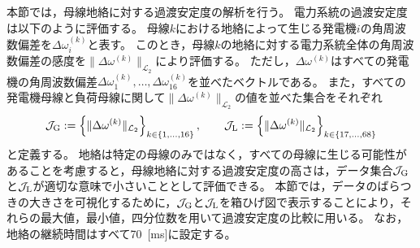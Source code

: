\documentclass[tombow,dvipdfmx]{corona-a5-1.1}
\begin{document}
本節では，母線地絡に対する過渡安定度の解析を行う。
電力系統の過渡安定度は以下のように評価する。
母線$k$における地絡によって生じる発電機$i$の角周波数偏差を$\Delta \omega_i^{(k)}$と表す。
このとき，母線$k$の地絡に対する電力系統全体の角周波数偏差の感度を$\|\Delta \omega^{(k)}\|_{\mathcal{L}_2}$により評価する。
ただし，$\Delta \omega^{(k)}$はすべての発電機の角周波数偏差$\Delta \omega_1^{(k)},\ldots,\Delta \omega_{16}^{(k)}$を並べたベクトルである。
また，すべての発電機母線と負荷母線に関して$\|\Delta \omega^{(k)}\|_{\mathcal{L}_2}$の値を並べた集合をそれぞれ
\begin{align*}%
\mathcal{J}_{\rm G}:=
\left\{
\| \Delta \omega^{(k)} \|_{\mathcal{L}_2}
\right\}_{k\in \{1,\ldots,16\} }
,\qquad
\mathcal{J}_{\rm L}
:=
\left\{
\| \Delta \omega^{(k)} \|_{\mathcal{L}_2}
\right\}_{k\in \{17,\ldots,68\} }
\end{align*}
と定義する。
地絡は特定の母線のみではなく，すべての母線に生じる可能性があることを考慮すると，母線地絡に対する過渡安定度の高さは，データ集合$\mathcal{J}_{\rm G}$と$\mathcal{J}_{\rm L}$が適切な意味で小さいこととして評価できる。
本節では，データのばらつきの大きさを可視化するために，$\mathcal{J}_{\rm G}$と$\mathcal{J}_{\rm L}$を箱ひげ図で表示することにより，それらの最大値，最小値，四分位数を用いて過渡安定度の比較に用いる。
なお，地絡の継続時間はすべて70~[ms]に設定する。
\end{document}
